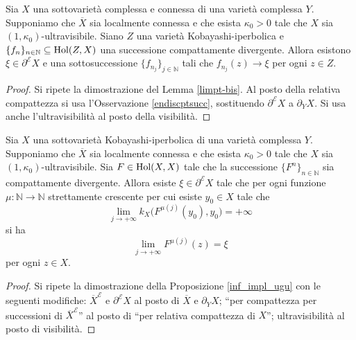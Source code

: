 \begin{lm} \label{limpt}
    Sia $X$ una sottovarietà complessa e connessa di una varietà complessa $Y$. Supponiamo che $\overline{X}$ sia localmente connessa e che esista $\kappa_0>0$ tale che $X$ sia $(1,\kappa_0)$-ultravisibile. Siano $Z$ una varietà Kobayashi-iperbolica e $\{f_n\}_{n\in\mathbb{N}}\subseteq\textnormal{Hol}(Z,X)$ una successione compattamente divergente. Allora esistono $\xi\in\partial^\mathcal{E}X$ e una sottosuccessione $\{f_{n_j}\}_{j\in\mathbb{N}}$ tali che $f_{n_j}(z)\longrightarrow\xi$ per ogni $z\in Z$.
\end{lm}

\begin{proof}
    Si ripete la dimostrazione del Lemma \ref{limpt-bis}. Al posto della relativa compattezza si usa l'Osservazione \ref{endiscptsucc}, sostituendo $\partial^\mathcal{E}X$ a $\partial_YX$. Si usa anche l'ultravisibilità al posto della visibilità.
\end{proof}

\begin{prop} \label{unaproppp}
    Sia $X$ una sottovarietà Kobayashi-iperbolica di una varietà complessa $Y$. Supponiamo che $\overline{X}$ sia localmente connessa e che esista $\kappa_0>0$ tale che $X$ sia $(1,\kappa_0)$-ultravisibile. Sia $F\in\textnormal{Hol}(X,X)$ tale che la successione $\{F^n\}_{n\in\mathbb{N}}$ sia compattamente divergente. Allora esiste $\xi\in\partial^\mathcal{E}X$ tale che per ogni funzione $\mu:\mathbb{N}\longrightarrow\mathbb{N}$ strettamente crescente per cui esiste $y_0 \in X$ tale che
    \begin{equation}
        \lim_{j\longrightarrow+\infty} k_X\big(F^{\mu(j)}(y_0),y_0\big)=+\infty
    \end{equation}
    si ha
    \begin{equation}
        \lim_{j\longrightarrow+\infty} F^{\mu(j)}(z)=\xi
    \end{equation}
    per ogni $z \in X$.
\end{prop}

\begin{proof}
    Si ripete la dimostrazione della Proposizione \ref{inf_impl_ugu} con le seguenti modifiche: $\overline{X}^\mathcal{E}$ e $\partial^\mathcal{E}X$ al posto di $\overline{X}$ e $\partial_YX$; ``per compattezza per successioni di $\overline{X}^\mathcal{E}$'' al posto di ``per relativa compattezza di $X$''; ultravisibilità al posto di visibilità.
\end{proof}

